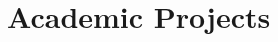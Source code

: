 \documentclass[10.8pt, a4paper]{extarticle}
\newcommand{\shorterSection}[1]{\vspace{-10pt}\section{#1}}
\begin{document}
\shorterSection{Academic Projects}
\vspace{-2pt}
\begin{itemize}




	    
	    
	    
	    
	    





\end{itemize}
\end{document}
